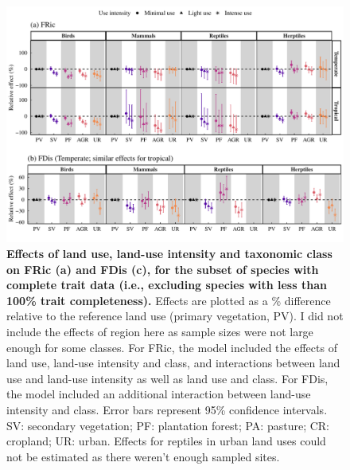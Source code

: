 \begin{figure}[h!]
\centering
\includegraphics[scale=0.7]{Supporting/Chapter3/Figures/SI_Figure22}
\caption[Effects of land use, land-use intensity and taxonomic class on FRic (a) and FDis (c), for the subset of species with complete trait data]{\textbf{Effects of land use, land-use intensity and taxonomic class on FRic (a) and FDis (c), for the subset of species with complete trait data (i.e., excluding species with less than 100\% trait completeness).} Effects are plotted as a \% difference relative to the reference land use (primary vegetation, PV). I did not include the effects of region here as sample sizes were not large enough for some classes. For FRic, the model included the effects of land use, land-use intensity and class, and interactions between land use and land-use intensity as well as land use and class. For FDis, the model included an additional interaction between land-use intensity and class. Error bars represent 95\% confidence intervals. SV: secondary vegetation; PF: plantation forest; PA: pasture; CR: cropland; UR: urban. Effects for reptiles in urban land uses could not be estimated as there weren’t enough sampled sites.}
\label{SI3_F22}
\end{figure}


